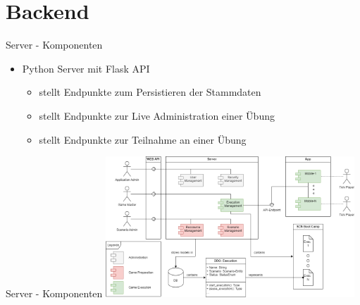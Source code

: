 \section{Backend}


\begin{frame}{Server - Komponenten}
	\begin{itemize}
		\item[] Python Server mit Flask API
		\begin{itemize}
			\itemsep 4pt
			\item stellt Endpunkte zum Persistieren der Stammdaten
			\item stellt Endpunkte zur Live Administration einer Übung
			\item stellt Endpunkte zur Teilnahme an einer Übung
		\end{itemize}
	\end{itemize}
\end{frame}


\begin{frame}{Server - Komponenten}
	\centering
	\includegraphics[width=0.7\textwidth]{images/server/component_diagram.png}
\end{frame}


